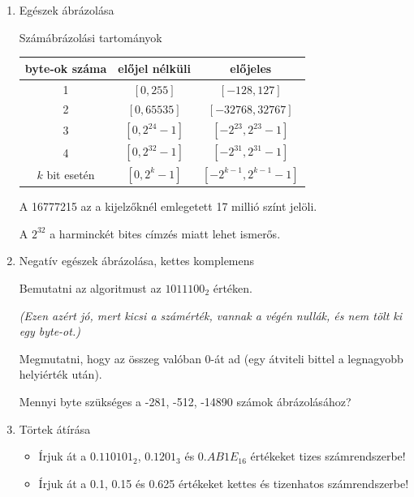 \documentclass[a4paper]{article}
\newenvironment{solution}
{\color{RoyalBlue}}{\bigskip}
\newenvironment{comment}
{\color{Green}}{\bigskip}
\begin{document}
\begin{enumerate}

\item

Egészek ábrázolása

Számábrázolási tartományok

\begin{solution}
\begin{tabular}{|c|c|c|}
byte-ok száma & előjel nélküli & előjeles \\
\hline
1 & $[0, 255]$ & $[-128, 127]$ \\
2 & $[0, 65535]$ & $[-32768, 32767]$ \\
3 & $[0, 2^{24} - 1]$ & $[-2^{23}, 2^{23} - 1]$ \\
4 & $[0, 2^{32} - 1]$ & $[-2^{31}, 2^{31} - 1]$ \\
\hline
$k$ bit esetén & $[0, 2^k - 1]$ & $[-2^{k-1}, 2^{k-1}-1]$ \\
\end{tabular}
\end{solution}

\begin{comment}
A 16777215 az a kijelzőknél emlegetett 17 millió színt jelöli.

A $2^{32}$ a harminckét bites címzés miatt lehet ismerős.
\end{comment}

\item

Negatív egészek ábrázolása, kettes komplemens

\begin{solution}
Bemutatni az algoritmust az $1011100_2$ értéken. 

\textit{(Ezen azért jó, mert kicsi a számérték, vannak a végén nullák, és nem tölt ki egy byte-ot.)}

Megmutatni, hogy az összeg valóban 0-át ad (egy átviteli bittel a legnagyobb helyiérték után).
\end{solution}

Mennyi byte szükséges a -281, -512, -14890 számok ábrázolásához?

\item

Törtek átírása
\begin{itemize}
	\item Írjuk át a $0.110101_2$, $0.1201_3$ és $0.AB1E_{16}$ értékeket tizes számrendszerbe!
	\item Írjuk át a 0.1, 0.15 és 0.625 értékeket kettes és tizenhatos számrendszerbe!
\end{itemize}


\end{enumerate}
\end{document}
